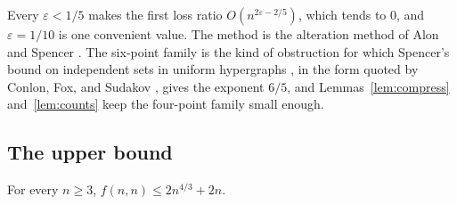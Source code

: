 Every $\varepsilon<1/5$ makes the first loss ratio $O(n^{2\varepsilon-2/5})$, which tends to $0$, and $\varepsilon=1/10$ is one convenient value. The method is the alteration method of Alon and Spencer \cite[Section~3.2]{alonspencer2016}. The six-point family is the kind of obstruction for which Spencer's bound on independent sets in uniform hypergraphs \cite{spencer1972}, in the form quoted by Conlon, Fox, and Sudakov \cite[Section~2]{conlonfoxsudakov2016}, gives the exponent $6/5$, and Lemmas~\ref{lem:compress} and~\ref{lem:counts} keep the four-point family small enough.

\subsection{The upper bound}

\begin{proposition}\label{prop:upper}
For every $n\ge3$, $f(n,n)\le2n^{4/3}+2n$.
\end{proposition}


